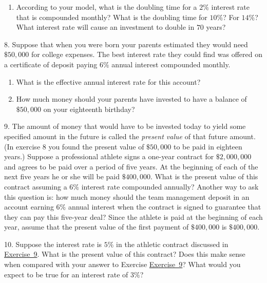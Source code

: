 \documentclass[10pt,]{book}
\theoremstyle{plain}
\theoremstyle{definition}
\theoremstyle{definition}
\theoremstyle{definition}
\numberwithin{equation}{section}
\begin{document}
\begin{exerciselist}
\begin{enumerate}[label=(\alph*)]
\item\hypertarget{li-112}{}According to your model, what is the doubling time for a \(2\%\) interest rate that is compounded monthly?  What is the doubling time for \(10\%\)?  For \(14\%\)? What interest rate will cause an investment to double in \(70\) years?%
\end{enumerate}
\par\smallskip
\item[8.]\hypertarget{exercise-57}{}Suppose that when you were born your parents estimated they would need \(\$50,000\) for college expenses.  The best interest rate they could find was offered on a certificate of deposit paying \(6\%\) annual interest compounded monthly.%
\leavevmode%
\begin{enumerate}[label=(\alph*)]
\item\hypertarget{li-113}{}What is the effective annual interest rate for this account?%
\item\hypertarget{li-114}{}How much money should your parents have invested to have a balance of \(\$50,000\) on your eighteenth birthday?%
\end{enumerate}
\par\smallskip
\item[9.]\hypertarget{athletic-contract}{}The amount of money that would have to be invested today to yield some specified amount in the future is called the \emph{present value} of that future amount.  (In exercise 8 you found the present value of \(\$50,000\) to be paid in eighteen years.)  Suppose a professional athlete signs a one-year contract for \(\$2,000,000\) and agrees to be paid over a period of five years.  At the beginning of each of the next five years he or she will be paid \(\$400,000\).  What is the present value of this contract assuming a \(6\%\) interest rate compounded annually?  Another way to ask this question is: how much money should the team management deposit in an account earning \(6\%\) annual interest when the contract is signed to guarantee that they can pay this five-year deal?  Since the athlete is paid at the beginning of each year, assume that the present value of the first payment of \(\$400,000\) is \(\$400,000\).%
\par\smallskip
\item[10.]\hypertarget{exercise-59}{}Suppose the interest rate is \(5\%\) in the athletic contract discussed in \hyperlink{athletic-contract}{Exercise~9}.  What is the present value of this contract?  Does this make sense when compared with your answer to Exercise \hyperlink{athletic-contract}{Exercise~9}?  What would you expect to be true for an interest rate of \(3\%\)?%
\par\smallskip
\end{exerciselist}
\typeout{************************************************}
\typeout{************************************************}
\end{document}

